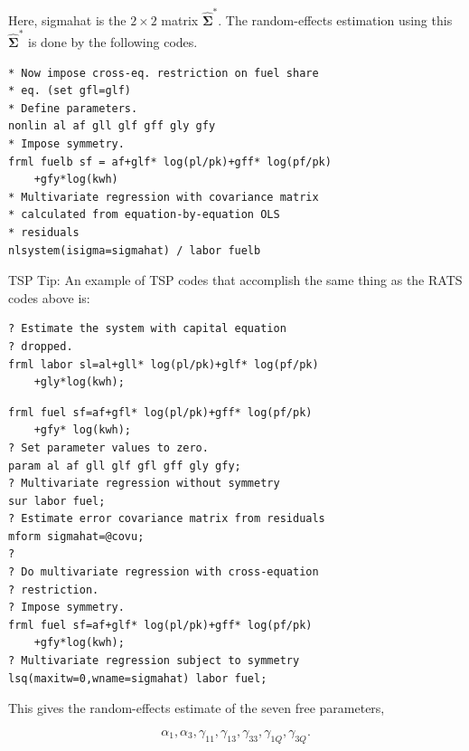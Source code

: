 \documentclass[10pt]{article}
\begin{document}
Here, sigmahat is the $2 \times 2$ matrix $\widehat{\boldsymbol{\Sigma}}^{*}$. The random-effects estimation using this $\widehat{\boldsymbol{\Sigma}}^{*}$ is done by the following codes.

\begin{verbatim}
* Now impose cross-eq. restriction on fuel share
* eq. (set gfl=glf)
* Define parameters.
nonlin al af gll glf gff gly gfy
* Impose symmetry.
frml fuelb sf = af+glf* log(pl/pk)+gff* log(pf/pk)
    +gfy*log(kwh)
* Multivariate regression with covariance matrix
* calculated from equation-by-equation OLS
* residuals
nlsystem(isigma=sigmahat) / labor fuelb
\end{verbatim}

TSP Tip: An example of TSP codes that accomplish the same thing as the RATS codes above is:

\begin{verbatim}
? Estimate the system with capital equation
? dropped.
frml labor sl=al+gll* log(pl/pk)+glf* log(pf/pk)
    +gly*log(kwh);
\end{verbatim}

\begin{verbatim}
frml fuel sf=af+gfl* log(pl/pk)+gff* log(pf/pk)
    +gfy* log(kwh);
? Set parameter values to zero.
param al af gll glf gfl gff gly gfy;
? Multivariate regression without symmetry
sur labor fuel;
? Estimate error covariance matrix from residuals
mform sigmahat=@covu;
?
? Do multivariate regression with cross-equation
? restriction.
? Impose symmetry.
frml fuel sf=af+glf* log(pl/pk)+gff* log(pf/pk)
    +gfy*log(kwh);
? Multivariate regression subject to symmetry
lsq(maxitw=0,wname=sigmahat) labor fuel;
\end{verbatim}

This gives the random-effects estimate of the seven free parameters,

$$
\alpha_{1}, \alpha_{3}, \gamma_{11}, \gamma_{13}, \gamma_{33}, \gamma_{1 Q}, \gamma_{3 Q} .
$$
\end{document}

